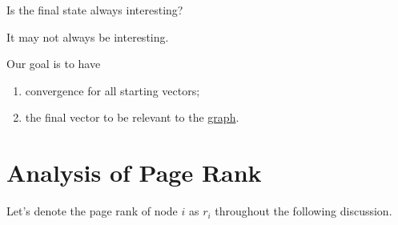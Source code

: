 \begin{problem}
Is the final state always interesting?
\end{problem}
\begin{answer}
	It may not always be interesting.
\end{answer}

Our goal is to have
\begin{enumerate}
	\item convergence for all starting vectors;
	\item the final vector to be relevant to the \hyperref[def:graph]{graph}.
\end{enumerate}

\section{Analysis of Page Rank}
Let's denote the page rank of node \(i\) as \(r_i\) throughout the following discussion.
